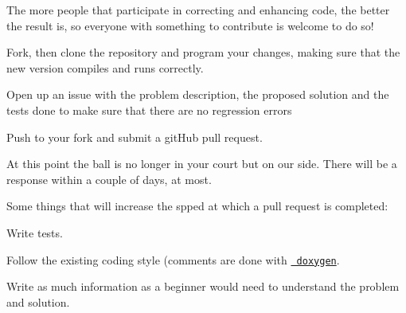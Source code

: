 The more people that participate in correcting and enhancing code, the better the result is, so everyone with something to contribute is welcome to do so!

Fork, then clone the repository and program your changes, making sure that the new version compiles and runs correctly.

Open up an issue with the problem description, the proposed solution and the tests done to make sure that there are no regression errors

Push to your fork and submit a git\+Hub pull request.

At this point the ball is no longer in your court but on our side. There will be a response within a couple of days, at most.

Some things that will increase the spped at which a pull request is completed\+:


\begin{DoxyItemize}
\item Write tests.
\item Follow the existing coding style (comments are done with \href{http://www.doxygen.nl/}{\texttt{ doxygen}}.
\item Write as much information as a beginner would need to understand the problem and solution. 
\end{DoxyItemize}